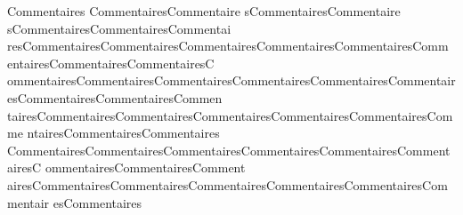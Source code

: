 			Commentaires CommentairesCommentaire sCommentairesCommentaire sCommentairesCommentairesCommentai resCommentairesCommentairesCommentairesCommentairesCommentairesComm entairesCommentairesCommentairesC ommentairesCommentairesCommentairesCommentairesCommentairesCommentair esCommentairesCommentairesCommen tairesCommentairesCommentairesCommentairesCommentairesCommentairesComme ntairesCommentairesCommentaires CommentairesCommentairesCommentairesCommentairesCommentairesCommentairesC ommentairesCommentairesComment airesCommentairesCommentairesCommentairesCommentairesCommentairesCommentair esCommentaires
			\clearpage
